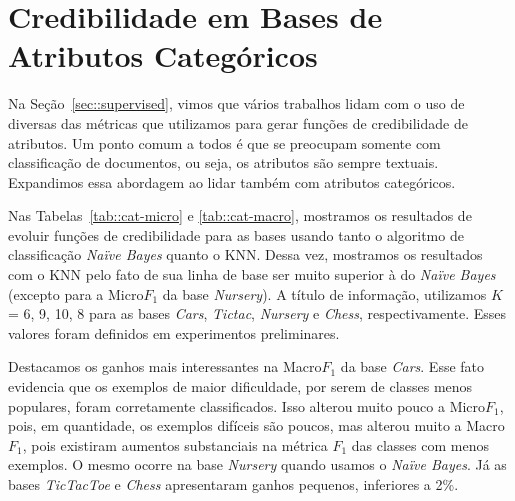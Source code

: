 

\section{Credibilidade em Bases de Atributos Categóricos}
\label{sec::categorias}


Na Seção~\ref{sec::supervised}, vimos que vários trabalhos lidam com o uso de diversas das métricas que utilizamos para gerar funções de credibilidade de atributos. Um ponto comum a todos
é que se preocupam somente com classificação de documentos, ou seja, os atributos são sempre textuais. Expandimos essa abordagem ao lidar também com atributos categóricos.

Nas Tabelas~\ref{tab::cat-micro} e \ref{tab::cat-macro}, mostramos os resultados de evoluir funções de credibilidade para as bases usando tanto o algoritmo de classificação \textit{Naïve Bayes} quanto o \textsc{KNN}. Dessa vez, mostramos os resultados com o \textsc{KNN} pelo fato de sua linha de base ser muito superior à do \textit{Naïve Bayes} (excepto para a Micro$F_1$ da base \textit{Nursery}). A título de informação, utilizamos $K$ = 6, 9, 10, 8 para as bases \textit{Cars}, \textit{Tictac}, \textit{Nursery} e \textit{Chess}, respectivamente. Esses valores foram definidos em experimentos preliminares.

Destacamos os ganhos mais interessantes na Macro$F_1$ da base \textit{Cars}. Esse fato evidencia que os exemplos de maior dificuldade, por serem de classes menos populares, foram corretamente classificados. Isso alterou muito pouco a Micro$F_1$, pois, em quantidade, os exemplos difíceis são poucos, mas alterou muito a Macro$F_1$, pois existiram aumentos substanciais na métrica $F_1$ das classes com menos exemplos. O mesmo ocorre na base \textit{Nursery} quando usamos o \textit{Naïve Bayes}. Já as bases \textit{TicTacToe} e \textit{Chess} apresentaram ganhos pequenos, inferiores a 2\%.


